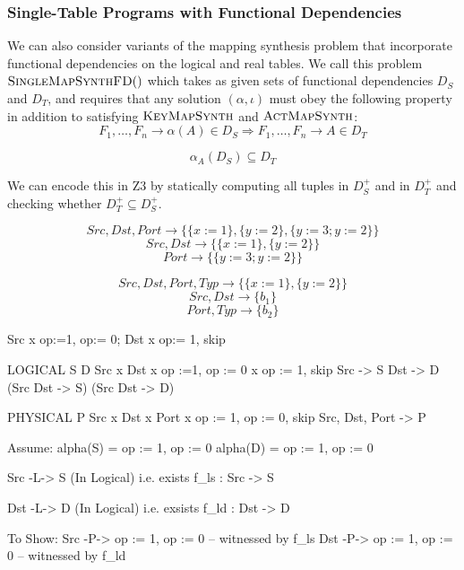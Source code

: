 \subsubsection{Single-Table Programs with Functional Dependencies}

We can also consider variants of the mapping synthesis problem that
incorporate functional dependencies on the logical and real tables. We
call this problem $\textsc{SingleMapSynthFD}()$ which takes as given
sets of functional dependencies $D_S$ and $D_T$, and requires that any
solution $(\alpha, \iota)$ must obey the following property in
addition to satisfying $\textsc{KeyMapSynth}$ and
$\textsc{ActMapSynth}$:
\[F_1,\ldots, F_n  \longrightarrow \alpha(A) \in D_S \Rightarrow
  F_1,\ldots, F_n \longrightarrow A \in D_T\]


\[\alpha_A(D_S) \subseteq D_T\]

We can encode this in Z3 by statically computing all tuples in $D_S^+$
and in $D_T^+$ and checking whether $D_T^+ \subseteq D_S^+$.

\[Src, Dst, Port \rightarrow \{\{x :=1\} , \{y:= 2\}, \{y:=3;y:=2\}\}\]
\[Src,Dst \rightarrow \{\{x :=1\}, \{y:= 2\}\}\]
\[Port \rightarrow \{\{y:=3;y:=2\}\}\]


\[Src, Dst, Port, Typ \rightarrow \{\{x:=1\}, \{y:=2\}\}\]
\[Src, Dst \rightarrow \{b_1\}\]
\[Port, Typ \rightarrow \{b_2\}\]




Src x {op:=1, op:= 0}; Dst x {op:= 1, skip}

LOGICAL              S               D
Src x Dst x {op :=1, op := 0} x {op := 1, skip}
Src -> S
Dst -> D
(Src Dst -> S)
(Src Dst -> D)

PHYSICAL                  P 
Src x Dst x Port x {op := 1, op := 0, skip}
Src, Dst, Port -> P

Assume:
alpha(S) = {op := 1, op := 0}
alpha(D) = {op := 1, op := 0}

Src -L-> S (In Logical)
i.e. exists f_ls : Src -> S

Dst -L-> D (In Logical)
i.e. exsists f_ld : Dst -> D

To Show:
Src -P-> { op := 1, op := 0 }
-- witnessed by f_ls
Dst -P-> { op := 1, op := 0 }
-- witnessed by f_ld

